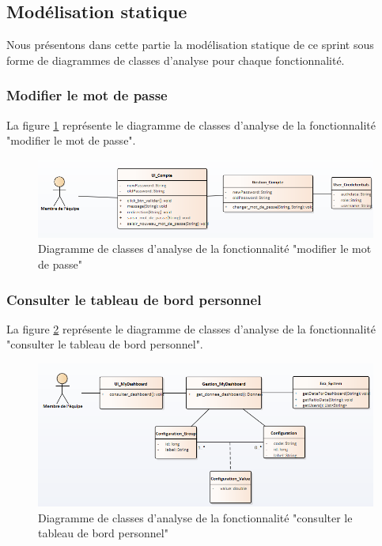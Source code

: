 \subsection{Modélisation statique}
Nous présentons dans cette partie la modélisation statique de ce sprint sous forme de diagrammes de classes d'analyse pour chaque fonctionnalité.

\subsubsection{Modifier le mot de passe}
La figure \ref{code77} représente le diagramme de classes d'analyse de la fonctionnalité "modifier le mot de passe".
\begin{figure}[H]
  \centering
 \includegraphics[scale=0.69]{figures/diagrams/class/changepassword_class_diag.png}
 \caption{Diagramme de classes d'analyse de la fonctionnalité "modifier le mot de passe"}
 \label{code77}
\end{figure}

\subsubsection{Consulter le tableau de bord personnel}
La figure \ref{code78} représente le diagramme de classes d'analyse de la fonctionnalité "consulter le tableau de bord personnel".
\begin{figure}[H]
  \centering
 \includegraphics[scale=0.69]{figures/diagrams/class/mydashboard_class_diag.png}
 \caption{Diagramme de classes d'analyse de la fonctionnalité "consulter le tableau de bord personnel"}
 \label{code78}
\end{figure}

